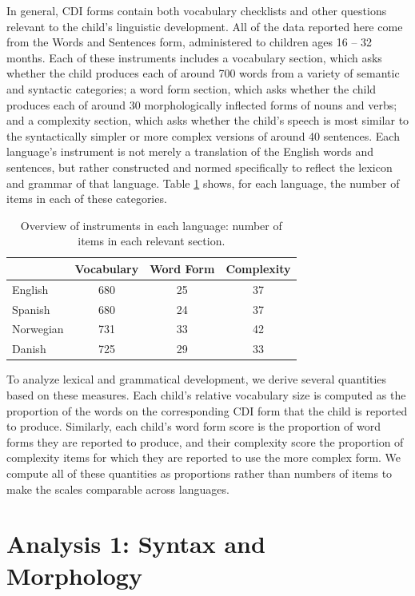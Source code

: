 \documentclass[10pt,letterpaper]{article}
\begin{document}
In general, CDI forms contain both vocabulary checklists and other questions relevant to the child's linguistic development. All of the data reported here come from the Words and Sentences form, administered to children ages 16 -- 32 months. Each of these instruments includes a vocabulary section, which asks whether the child produces each of around 700 words from a variety of semantic and syntactic categories; a word form section, which asks whether the child produces each of around 30 morphologically inflected forms of nouns and verbs; and a complexity section, which asks whether the child's speech is most similar to the syntactically simpler or more complex versions of around 40 sentences. Each language's instrument is not merely a translation of the English words and sentences, but rather constructed and normed specifically to reflect the lexicon and grammar of that language. Table \ref{table:measures} shows, for each language, the number of items in each of these categories.

\begin{table}[t]
\begin{center}
\begin{tabular}{lccc}
\hline
& Vocabulary & Word Form & Complexity\\ 
\hline
English & 680 & 25 & 37\\ 
Spanish & 680 & 24 & 37\\ 
Norwegian & 731 & 33 & 42\\ 
Danish & 725 & 29 & 33\\ 
\hline
\end{tabular}
\caption{\label{table:measures} Overview of instruments in each language: number of items in each relevant section.}
\end{center}
\end{table}

To analyze lexical and grammatical development, we derive several quantities based on these measures. Each child's relative vocabulary size is computed as the proportion of the words on the corresponding CDI form that the child is reported to produce. Similarly, each child's word form score is the proportion of word forms they are reported to produce, and their complexity score the proportion of complexity items for which they are reported to use the more complex form. We compute all of these quantities as proportions rather than numbers of items to make the scales comparable across languages.

\section{Analysis 1: Syntax and Morphology}
\end{document}
